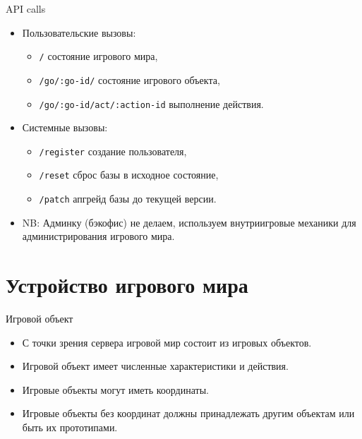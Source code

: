 \documentclass[aspectratio=169,handout,bigger]{beamer}
\begin{document}
\begin{frame}{API calls}
  \begin{itemize}
    \item Пользовательские вызовы:
      \begin{itemize}
        \item \texttt{/} состояние игрового мира,
        \item \texttt{/go/:go-id/} состояние игрового объекта,
        \item \texttt{/go/:go-id/act/:action-id} выполнение действия.
      \end{itemize}
    \item Системные вызовы:
    \begin{itemize}
      \item \texttt{/register} создание пользователя,
      \item \texttt{/reset} сброс базы в исходное состояние,
      \item \texttt{/patch} апгрейд базы до текущей версии.
    \end{itemize}
    \item NB: Админку (бэкофис) не делаем,
          используем внутриигровые механики для администрирования игрового мира.
  \end{itemize}
\end{frame}


\section{Устройство игрового мира}


\begin{frame}{Игровой объект}
  \begin{itemize}
    \item С точки зрения сервера игровой мир состоит из игровых объектов.
    \item Игровой объект имеет численные характеристики и действия.
    \item Игровые объекты могут иметь координаты.
    \item Игровые объекты без координат должны принадлежать другим объектам
          или быть их прототипами.
  \end{itemize}
\end{frame}
\end{document}
